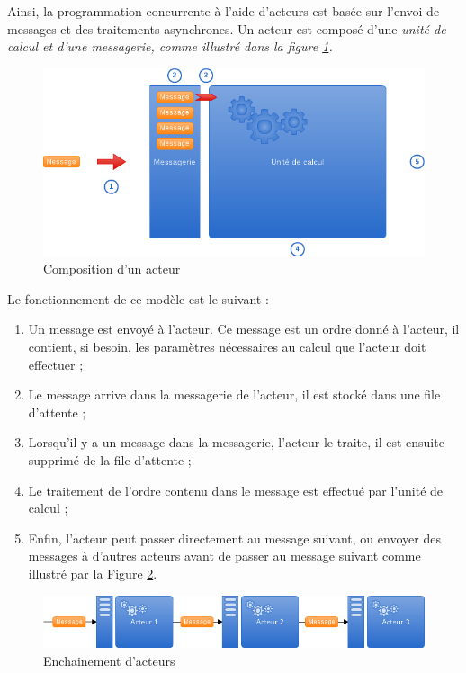 Ainsi, la programmation concurrente à l'aide d'acteurs est basée sur l'envoi de messages et des traitements asynchrones. Un acteur est composé d'une \em{unité de calcul} et d'une \em{messagerie}, comme illustré dans la figure \ref{actor}.

\begin{figure}[h]
\begin{center}
\includegraphics[width=400pt]{img/acteur.png}
\end{center}
\caption{Composition d'un acteur}
\label{actor}
\end{figure}

Le fonctionnement de ce modèle est le suivant :
\begin{enumerate}
  \item Un message est envoyé à l'acteur. Ce message est un ordre donné à l'acteur, il contient, si besoin, les paramètres nécessaires au calcul que l'acteur doit effectuer ;
  \item Le message arrive dans la messagerie de l'acteur, il est stocké dans une file d'attente ;
  \item Lorsqu'il y a un message dans la messagerie, l'acteur le traite, il est ensuite supprimé de la file d'attente ;
  \item Le traitement de l'ordre contenu dans le message est effectué par l'unité de calcul ;
  \item Enfin, l'acteur peut passer directement au message suivant, ou envoyer des messages à d'autres acteurs avant de passer au message suivant comme illustré par la Figure \ref{actors}.
\end{enumerate}

\begin{figure}[h]
\begin{center}
\includegraphics[width=400pt]{img/acteurs.png}
\end{center}
\caption{Enchainement d'acteurs}
\label{actors}
\end{figure}

